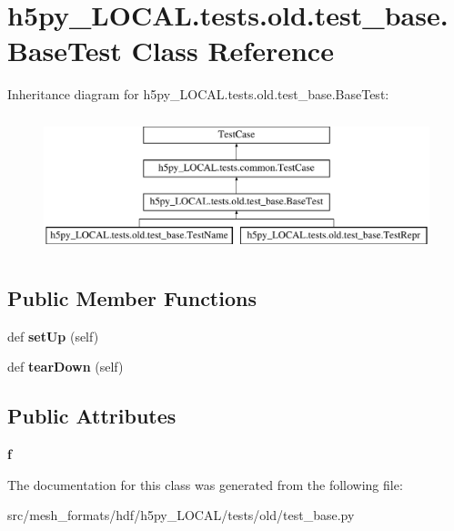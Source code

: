 \hypertarget{classh5py__LOCAL_1_1tests_1_1old_1_1test__base_1_1BaseTest}{}\section{h5py\+\_\+\+L\+O\+C\+A\+L.\+tests.\+old.\+test\+\_\+base.\+Base\+Test Class Reference}
\label{classh5py__LOCAL_1_1tests_1_1old_1_1test__base_1_1BaseTest}
Inheritance diagram for h5py\+\_\+\+L\+O\+C\+A\+L.\+tests.\+old.\+test\+\_\+base.\+Base\+Test\+:\begin{figure}[H]
\begin{center}
\leavevmode
\includegraphics[height=4.000000cm]{classh5py__LOCAL_1_1tests_1_1old_1_1test__base_1_1BaseTest}
\end{center}
\end{figure}
\subsection*{Public Member Functions}
\begin{DoxyCompactItemize}
\item 
\mbox{\label{classh5py__LOCAL_1_1tests_1_1old_1_1test__base_1_1BaseTest_a774245b78449bbaf9adccbe0612b8da1}} 
def {\bfseries set\+Up} (self)
\item 
\mbox{\label{classh5py__LOCAL_1_1tests_1_1old_1_1test__base_1_1BaseTest_a0e45e49dcc80561350f1763cc0c7282c}} 
def {\bfseries tear\+Down} (self)
\end{DoxyCompactItemize}
\subsection*{Public Attributes}
\begin{DoxyCompactItemize}
\item 
\mbox{\label{classh5py__LOCAL_1_1tests_1_1old_1_1test__base_1_1BaseTest_a6f74d042a69d288a768ec77a72720903}} 
{\bfseries f}
\end{DoxyCompactItemize}


The documentation for this class was generated from the following file\+:\begin{DoxyCompactItemize}
\item 
src/mesh\+\_\+formats/hdf/h5py\+\_\+\+L\+O\+C\+A\+L/tests/old/test\+\_\+base.\+py\end{DoxyCompactItemize}
